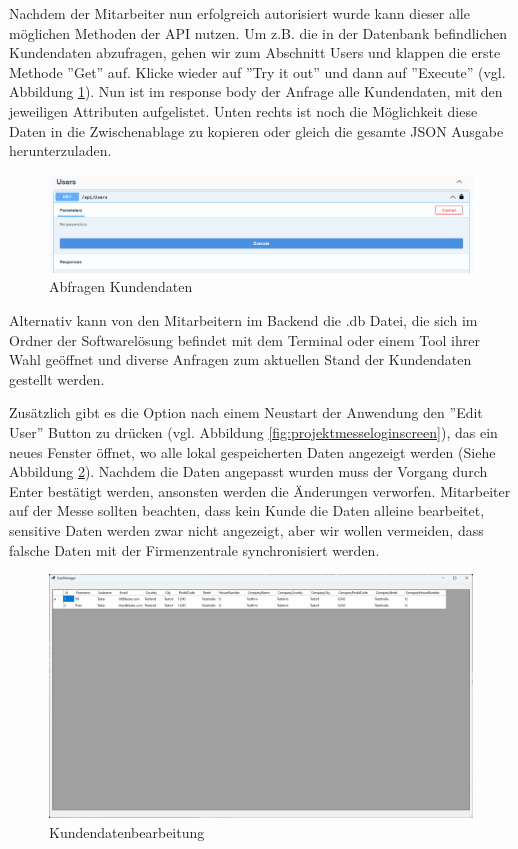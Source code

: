 Nachdem der Mitarbeiter nun erfolgreich autorisiert wurde kann dieser alle möglichen Methoden der API nutzen. Um z.B. die in der Datenbank befindlichen Kundendaten abzufragen, gehen wir zum Abschnitt Users und klappen die erste Methode ''Get'' auf. Klicke wieder auf ''Try it out'' und dann auf ''Execute'' (vgl. Abbildung \ref{fig:projektmesseswagger3}). Nun ist im response body der Anfrage alle Kundendaten, mit den jeweiligen Attributen aufgelistet. Unten rechts ist noch die Möglichkeit diese Daten in die Zwischenablage zu kopieren oder gleich die gesamte JSON Ausgabe herunterzuladen.

\begin{figure}[h]
	\centering
	\includegraphics[width=0.9\linewidth]{Images/Projekt_Messe_Swagger3}
	\caption{Abfragen Kundendaten}
	\label{fig:projektmesseswagger3}
\end{figure}

Alternativ kann von den Mitarbeitern im Backend die .db Datei, die sich im Ordner der Softwarelösung befindet mit dem Terminal oder einem Tool ihrer Wahl geöffnet und diverse Anfragen zum aktuellen Stand der Kundendaten gestellt werden.

Zusätzlich gibt es die Option nach einem Neustart der Anwendung den ''Edit User'' Button zu drücken (vgl. Abbildung \ref{fig:projektmesseloginscreen}), das ein neues Fenster öffnet, wo alle lokal gespeicherten Daten angezeigt werden (Siehe Abbildung \ref{fig:usergrid}). Nachdem die Daten angepasst wurden muss der Vorgang durch Enter bestätigt werden, ansonsten
werden die Änderungen verworfen. Mitarbeiter auf der Messe sollten beachten, dass kein Kunde die Daten alleine bearbeitet, sensitive Daten werden zwar nicht angezeigt, aber wir wollen vermeiden, dass falsche Daten mit der Firmenzentrale synchronisiert werden.

\begin{figure}[h]
	\centering
	\includegraphics[width=0.9\linewidth]{Images/UserGrid}
	\caption{Kundendatenbearbeitung}
	\label{fig:usergrid}
\end{figure}

